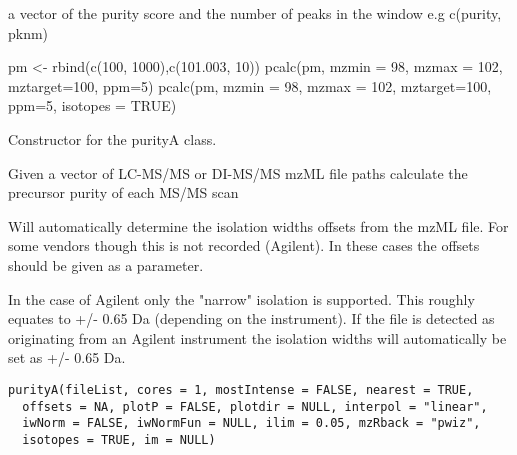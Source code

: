 \documentclass[letterpaper]{book}
\begin{document}
%
\begin{Value}
a vector of the purity score and the number of peaks in the window e.g c(purity, pknm)
\end{Value}
%
\begin{Examples}
\begin{ExampleCode}
pm <- rbind(c(100, 1000),c(101.003, 10))
pcalc(pm, mzmin = 98, mzmax = 102, mztarget=100, ppm=5)
pcalc(pm, mzmin = 98, mzmax = 102, mztarget=100, ppm=5, isotopes = TRUE)

\end{ExampleCode}
\end{Examples}
%
\begin{Description}\relax
Constructor for the purityA class.

Given a vector of LC-MS/MS or DI-MS/MS mzML file paths calculate the
precursor purity of each MS/MS scan

Will automatically determine the isolation widths offsets from the mzML file.
For some vendors though this is not recorded (Agilent).
In these cases the offsets should be given as a parameter.

In the case of Agilent only the "narrow" isolation is supported.
This roughly equates to +/- 0.65 Da (depending on the instrument). If the
file is detected as originating from an Agilent instrument the isolation
widths will automatically be set as +/- 0.65 Da.
\end{Description}
%
\begin{Usage}
\begin{verbatim}
purityA(fileList, cores = 1, mostIntense = FALSE, nearest = TRUE,
  offsets = NA, plotP = FALSE, plotdir = NULL, interpol = "linear",
  iwNorm = FALSE, iwNormFun = NULL, ilim = 0.05, mzRback = "pwiz",
  isotopes = TRUE, im = NULL)
\end{verbatim}
\end{Usage}
%
\end{document}
